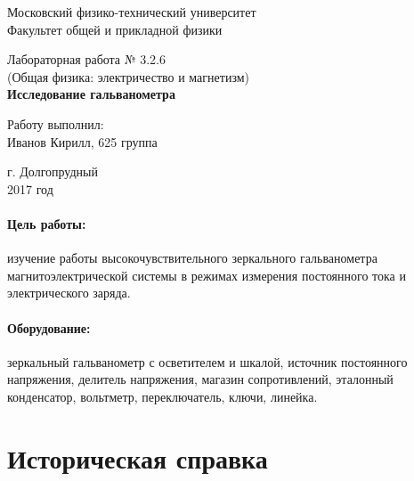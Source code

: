 \documentclass[12pt]{kiarticle} %
\begin{document}
	
	\begin{titlepage}
		\begin{center}
			\large 	Московский физико-технический университет \\
			Факультет общей и прикладной физики \\
			\vspace{0.2cm}
			
			\vspace{4.5cm}
			Лабораторная работа № 3.2.6 \\ \vspace{0.2cm}
			\large (Общая физика: электричество и магнетизм) \\ \vspace{0.2cm}
			\LARGE \textbf{Исследование гальванометра}
		\end{center}
		\vspace{2.3cm} \large
		
		\begin{center}
			Работу выполнил: \\
			Иванов Кирилл,
			625 группа
			\vspace{10mm}
			
			
			
			
		\end{center}
		
		\begin{center} \vspace{60mm}
			г. Долгопрудный \\
			2017 год
		\end{center}
	\end{titlepage}
	
	
	
	
	\paragraph*{Цель работы:} изучение работы высокочувствительного зеркального гальванометра магнитоэлектрической системы в режимах измерения постоянного тока и электрического заряда.
	
	\paragraph*{Оборудование:} зеркальный гальванометр с осветителем и
	шкалой, источник постоянного напряжения, делитель напряжения, магазин сопротивлений, эталонный конденсатор, вольтметр, переключатель, ключи, линейка.
	
	
	\section{Историческая справка}
	
\end{document}
